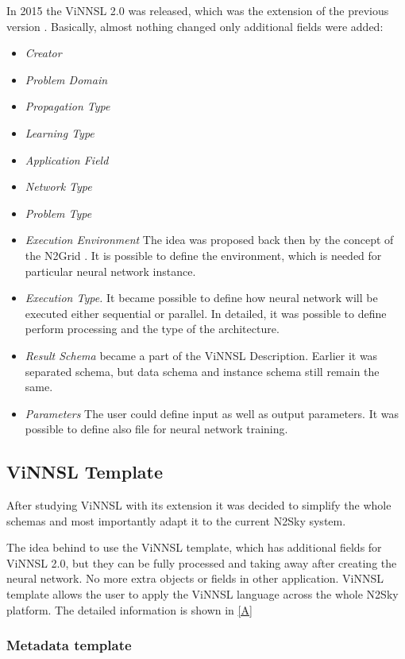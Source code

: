 In 2015 the ViNNSL 2.0 was released, which was the extension of the previous version \cite{ijcnn15}. Basically, almost nothing changed only additional fields were added:
\begin{itemize}
\item \emph{Creator}
\item \emph{Problem Domain}
\item \emph{Propagation Type}
\item \emph{Learning Type}
\item \emph{Application Field}
\item \emph{Network Type}
\item \emph{Problem Type}
\item \emph{Execution Environment} The idea was proposed back then by the concept of the N2Grid \cite{schikuta2004n2grid}. It is possible to define the environment, which is needed for particular neural network instance. 
\item \emph{Execution Type.} It became possible to define how neural network will be executed either sequential or parallel. In detailed, it was possible to define perform processing and the type of the architecture.
\item \emph{Result Schema} became a part of the ViNNSL Description. Earlier it was separated schema, but data schema and instance schema still remain the same.
\item \emph{Parameters} The user could define input as well as output parameters. It was possible to define also file for neural network training.
\end{itemize}

\subsection{ViNNSL Template}\label{ViNNSL Template}

After studying ViNNSL with its extension it was decided to simplify the whole schemas and most importantly adapt it to the current N2Sky system.

The idea behind to use the ViNNSL template, which has additional fields for ViNNSL 2.0, but they can be fully processed and taking away after creating the neural network. No more extra objects or fields in other application. ViNNSL template allows the user to apply the ViNNSL language across the whole N2Sky platform. The detailed information is shown in \autoref{A}

\subsubsection{Metadata template}\label{Metadata template}

